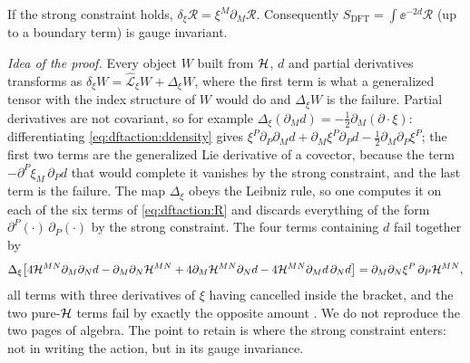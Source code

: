\begin{theorem}\label{thm:dftaction:scalar}
If the strong constraint holds, $\delta_\xi\mathcal R=\xi^M\partial_M\mathcal R$. Consequently
$S_{\text{DFT}}=\int\ee^{-2d}\mathcal R$ (up to a boundary term) is gauge invariant. \TL
{}
\end{theorem}

\noindent\emph{Idea of the proof.} Every object $W$ built from $\mathcal{H}$, $d$ and partial
derivatives transforms as $\delta_\xi W=\widehat{\mathcal L}_\xi W+\Delta_\xi W$, where the first
term is what a generalized tensor with the index structure of $W$ would do and $\Delta_\xi W$
is the failure. Partial derivatives are not covariant, so for example
$\Delta_\xi(\partial_Md)=-\tfrac12\partial_M(\partial\cdot\xi)$: differentiating
\eqref{eq:dftaction:ddensity} gives $\xi^P\partial_P\partial_Md+\partial_M\xi^P\partial_Pd
-\tfrac12\partial_M\partial_P\xi^P$; the first two terms are the generalized Lie derivative of a
covector, because the term $-\partial^P\xi_M\,\partial_Pd$ that would complete it vanishes by
the strong constraint, and the last term is the failure. The map $\Delta_\xi$ obeys the Leibniz rule, so one computes it
on each of the six terms of \eqref{eq:dftaction:R} and discards everything of the form
$\partial^P(\cdot)\,\partial_P(\cdot)$ by the strong constraint. The four terms containing $d$
fail together by
\begin{equation}\label{eq:dftaction:failure}
\Delta_\xi\bigl[4\mathcal{H}^{MN}\partial_M\partial_Nd-\partial_M\partial_N\mathcal{H}^{MN}+4\partial_M\mathcal{H}^{MN}
\partial_Nd-4\mathcal{H}^{MN}\partial_Md\,\partial_Nd\bigr]=\partial_M\partial_N\xi^P\,\partial_P\mathcal{H}^{MN},
\end{equation}
all terms with three derivatives of $\xi$ having cancelled inside the bracket, and the two
pure-$\mathcal{H}$ terms fail by exactly the opposite amount
. We do not reproduce the two pages of
algebra. The point to retain is where the strong constraint enters: not in writing
the action, but in its gauge invariance.

